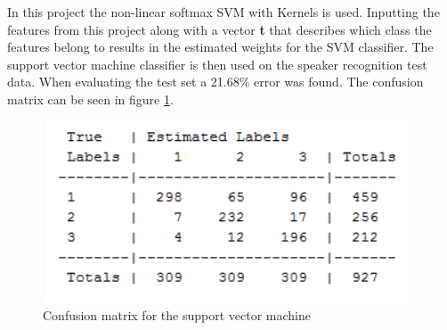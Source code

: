 %
%
%
%

In this project the non-linear softmax SVM with Kernels is used. Inputting the features from this project along with a vector \textbf{t} that describes which class the features belong to results in the estimated weights for the SVM classifier. The support vector machine classifier is then used on the speaker recognition test data. When evaluating the test set a 21.68\% error was found. The confusion matrix can be seen in figure \ref{fig:conmatsvm}. 

\begin{figure}[H]
\centering
\includegraphics[scale=.75]{billeder/conmatsvm}
\caption{Confusion matrix for the support vector machine }
\label{fig:conmatsvm}
\end{figure}


